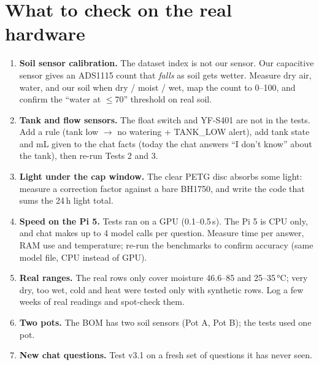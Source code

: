 \documentclass[10pt,a4paper]{article}
\begin{document}
\section{What to check on the real hardware}
\begin{enumerate}
  \item \textbf{Soil sensor calibration.} The dataset index is not our sensor. Our capacitive sensor gives an ADS1115
        count that \emph{falls} as soil gets wetter. Measure dry air, water, and our soil when dry / moist / wet,
        map the count to 0--100, and confirm the ``water at $\le$70'' threshold on real soil.
  \item \textbf{Tank and flow sensors.} The float switch and YF-S401 are not in the tests. Add a rule
        (tank low $\rightarrow$ no watering + TANK\_LOW alert), add tank state and mL given to the chat facts
        (today the chat answers ``I don't know'' about the tank), then re-run Tests 2 and 3.
  \item \textbf{Light under the cap window.} The clear PETG disc absorbs some light: measure a correction
        factor against a bare BH1750, and write the code that sums the 24\,h light total.
  \item \textbf{Speed on the Pi 5.} Tests ran on a GPU (0.1--0.5\,s). The Pi 5 is CPU only, and chat makes up to
        4 model calls per question. Measure time per answer, RAM use and temperature; re-run the benchmarks
        to confirm accuracy (same model file, CPU instead of GPU).
  \item \textbf{Real ranges.} The real rows only cover moisture 46.6--85 and 25--35\,°C; very dry, too wet, cold
        and heat were tested only with synthetic rows. Log a few weeks of real readings and spot-check them.
  \item \textbf{Two pots.} The BOM has two soil sensors (Pot A, Pot B); the tests used one pot.
  \item \textbf{New chat questions.} Test v3.1 on a fresh set of questions it has never seen.
\end{enumerate}
\end{document}
